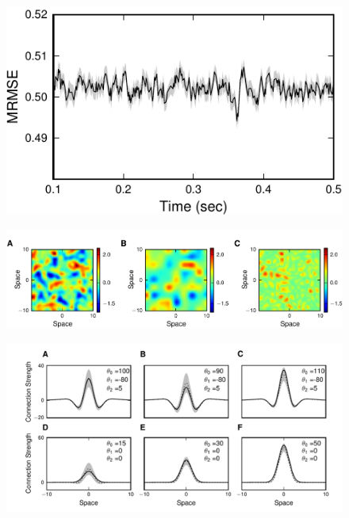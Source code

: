 \documentclass[review,authoryear,3p]{elsarticle}
\begin{document}
\clearpage
\newpage
\begin{figure}[!ht]
\begin{center}
\includegraphics{./Graph/pdf/fig8.pdf}
\end{center}
\caption{}
\label{fig:Figure8}
\end{figure}
\clearpage
\newpage
\begin{figure}[!ht]
\begin{center}
\includegraphics{./Graph/pdf/fig9.pdf}
\end{center}
\caption{}
\label{fig:Figure9}
\end{figure}
\clearpage
\newpage
\begin{figure}[!ht]
\begin{center}
\includegraphics{./Graph/pdf/fig10.pdf}
\end{center}
\caption{}
\label{fig:Figure10}
\end{figure}
\end{document}
